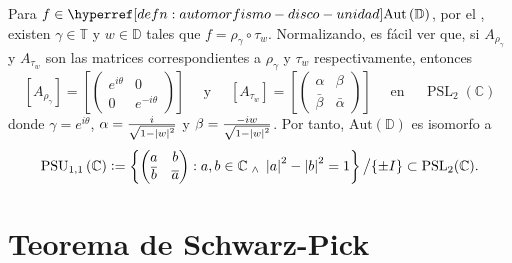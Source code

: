 Para $f \in \exhyperref[defn:automorfismo-disco-unidad]{automorfismo-disco-unidad}{\mathrm{Aut} \left(\mathbb{D} \right)}$, por el , existen $\gamma \in \mathbb{T}$ y $w \in \mathbb{D}$ tales que $f = \rho_{\gamma} \circ \tau_w$. Normalizando, es fácil ver que, si $A_{\rho_{\gamma}}$ y $A_{\tau_w}$ son las matrices correspondientes a $\rho_{\gamma}$ y $\tau_w$ respectivamente, entonces
\[
[A_{\rho_{\gamma}}] = \left[\begin{pmatrix}
    e^{i \theta} & 0 \\
    0 & e^{-i \theta}
\end{pmatrix}\right] \quad \text{ y }\quad [A_{\tau_w}] = \left[\begin{pmatrix}
    \alpha & \beta \\
    \bar{\beta} & \bar{\alpha}
\end{pmatrix}\right] \quad \text{ en } \quad \operatorname{PSL}_2(\mathbb{C})
\]
donde $\gamma = e^{i\theta}$, $\alpha = \frac{i}{\sqrt{1 - \left|w\right|^2}}$ y $\beta = \frac{-iw}{\sqrt{1 - \left|w\right|^2}}$. Por tanto, $\mathrm{Aut} \left(\mathbb{D} \right)$ es isomorfo a
\[
\operatorname{PSU}_{1, 1} \left(\mathbb{C}\right) \vcentcolon= \left\{ \begin{pmatrix}
    a & b \\
    \overline{b} & \overline{a}
\end{pmatrix} : a, b \in \mathbb{C} \; _{\wedge} \; \left|a\right|^2 - \left|b\right|^2 = 1 \right\} \big/ \{\pm I\} \subset \operatorname{PSL}_2(\mathbb{C}).
\]


\section{Teorema de Schwarz-Pick}

